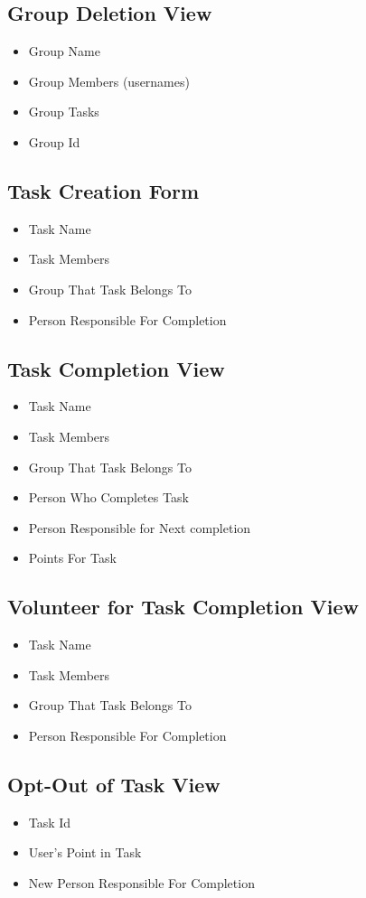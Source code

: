 \documentclass[11pt, a4paper]{report}
\begin{document}
\subsection*{Group Deletion View}
\begin{itemize}
\item Group Name
\item Group Members (usernames)
\item Group Tasks
\item Group Id
\end{itemize}

\subsection*{Task Creation Form}
\begin{itemize}
\item Task Name
\item Task Members
\item Group That Task Belongs To
\item Person Responsible For Completion
\end{itemize}

\subsection*{Task Completion View}
\begin{itemize}
\item Task Name
\item Task Members
\item Group That Task Belongs To
\item Person Who Completes Task
\item	Person Responsible for Next completion
\item Points For Task
\end{itemize}

\subsection*{Volunteer for Task Completion View}
\begin{itemize}
\item Task Name
\item Task Members
\item Group That Task Belongs To
\item Person Responsible For Completion
\end{itemize}

\subsection*{Opt-Out of Task View}
\begin{itemize}
\item Task Id
\item User's Point in Task
\item New Person Responsible For Completion
\end{itemize}
\end{document}
